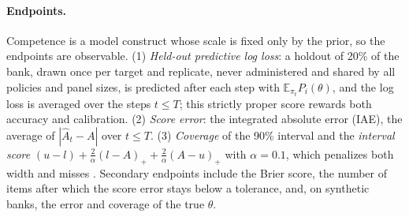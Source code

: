\paragraph{Endpoints.} Competence is a model construct whose scale is fixed only by the
prior, so the endpoints are observable. (1) \emph{Held-out predictive log loss}: a holdout of
20\% of the bank, drawn once per target and replicate, never administered and shared by all
policies and panel sizes, is predicted after each step with $\mathbb E_{\pi_t}P_i(\theta)$,
and the log loss is averaged over the steps $t\le T$; this strictly proper score rewards both
accuracy and calibration. (2) \emph{Score error}: the integrated absolute error (IAE), the
average of $|\hat A_t-A|$ over $t\le T$. (3) \emph{Coverage} of the 90\% interval and the
\emph{interval score} $(u-l)+\frac2\alpha(l-A)_++\frac2\alpha(A-u)_+$ with $\alpha=0.1$,
which penalizes both width and misses \citep{gneiting2007strictly}. Secondary endpoints
include the Brier score, the number of items after which the score error stays below a
tolerance, and, on synthetic banks, the error and coverage of the true $\theta$.
